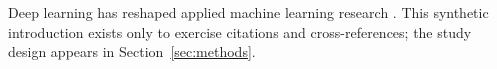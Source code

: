 Deep learning has reshaped applied machine learning research \citep{lecun2015deep}.
This synthetic introduction exists only to exercise citations and cross-references;
the study design appears in Section~\ref{sec:methods}.
